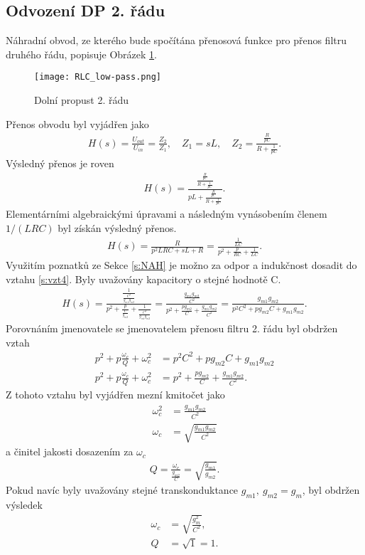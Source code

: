 \subsection{Odvození DP 2. řádu}\label{s:ODV}
\noindent Náhradní obvod, ze kterého bude spočítána přenosová funkce pro přenos filtru druhého řádu, popisuje Obrázek \ref{s:DPO}.
\begin{figure}[h]
\centering
\texttt{[image: RLC\_low-pass.png]}
\caption[Dolní propust 2. řádu]{Dolní propust 2. řádu \cite{15} \label{s:DPO}}
\end{figure}
\noindent Přenos obvodu byl vyjádřen jako
\begin{align}
H(s) = \frac{U_{out}}{U_{in}} = \frac{Z_2}{Z_1}, \quad Z_1 = sL,\quad Z_2 = \frac{\frac{R}{pC}}{R + \frac{1}{pC}}.
\end{align}
Výsledný přenos je roven 
\begin{align}
H(s) = \frac{\frac{\frac{R}{pC}}{R + \frac{1}{pC}}}{pL + \frac{\frac{R}{pC}}{R + \frac{1}{pC}}}.
\end{align}
Elementárními algebraickými úpravami a následným vynásobením členem $1/(LRC)$ byl získán výsledný přenos.
\begin{align}\label{s:vzt4}
H(s) = \frac{R}{p^2LRC + sL + R} = \frac{\frac{1}{LC}}{p^2 + \frac{p}{RC} + \frac{1}{LC}}.
\end{align}
\noindent Využitím poznatků ze Sekce \ref{s:NAH} je možno za odpor a indukčnost dosadit do vztahu \ref{s:vzt4}. Byly uvažovány kapacitory o stejné hodnotě C.
\begin{align}
H(s) = \frac{\frac{1}{\frac{C^2}{g_{m1}g_{m2}}}}{p^2 + \frac{p}{\frac{C}{g_{m2}}} + \frac{1}{\frac{C^2}{g_{m1}g_{m2}}}} = \frac{\frac{g_{m1}g_{m2}}{C^2}}{p^2 + \frac{pg_{m2}}{C} + \frac{g_{m1}g_{m2}}{C^2}} = \frac{g_{m1}g_{m2}}{p^2C^2 + pg_{m2}C + g_{m1}g_{m2}}.
\end{align}
Porovnáním jmenovatele se jmenovatelem přenosu filtru 2. řádu byl obdržen vztah
\begin{align}
p^2 + p\frac{\omega _c}{Q} + \omega _c^2 &= p^2C^2 + pg_{m2}C + g_{m1}g_{m2}\\
p^2 + p\frac{\omega _c}{Q} + \omega _c^2 &= p^2 + \frac{pg_{m2}}{C} + \frac{g_{m1}g_{m2}}{C^2}.
\end{align}
Z tohoto vztahu byl vyjádřen mezní kmitočet jako 
\begin{align}
\omega _c^2 &= \frac{g_{m1}g_{m2}}{C^2} \\
\omega _c &= \sqrt{\frac{g_{m1}g_{m2}}{C^2}}
\end{align}
a činitel jakosti dosazením za $\omega _c$
\begin{align}
Q = \frac{\omega _c}{\frac{g_{m2}}{C}} = \sqrt{\frac{g_{m1}}{g_{m2}}}.
\end{align}
Pokud navíc byly uvažovány stejné transkonduktance $g_{m1}, \ g_{m2} = g_m$, byl obdržen výsledek
\begin{align}
\omega _c &= \sqrt{\frac{g_m^2}{C^2}},\\
Q &= \sqrt{1} = 1.
\end{align}